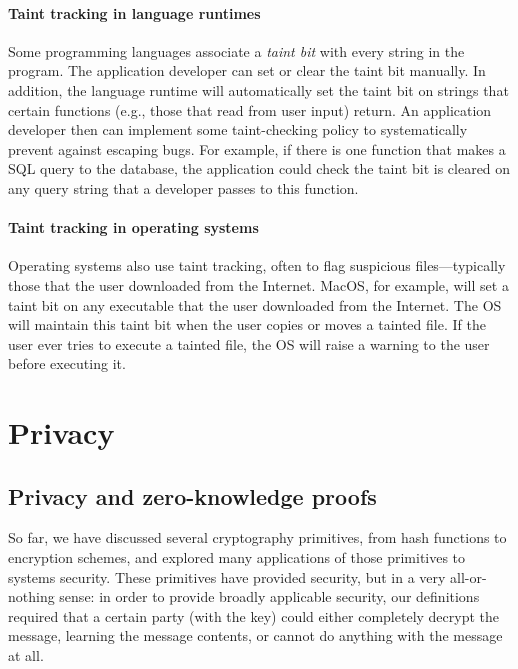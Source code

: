\documentclass[
  letterpaper,
]{scrbook}
\theoremstyle{definition}
\theoremstyle{plain}
\theoremstyle{plain}
\theoremstyle{remark}
\begin{document}
\subsection{Taint tracking in language
runtimes}\label{taint-tracking-in-language-runtimes}

Some programming languages associate a \emph{taint bit} with every
string in the program. The application developer can set or clear the
taint bit manually. In addition, the language runtime will automatically
set the taint bit on strings that certain functions (e.g., those that
read from user input) return. An application developer then can
implement some taint-checking policy to systematically prevent against
escaping bugs. For example, if there is one function that makes a SQL
query to the database, the application could check the taint bit is
cleared on any query string that a developer passes to this function.

\subsection{Taint tracking in operating
systems}\label{taint-tracking-in-operating-systems}

Operating systems also use taint tracking, often to flag suspicious
files---typically those that the user downloaded from the Internet.
MacOS, for example, will set a taint bit on any executable that the user
downloaded from the Internet. The OS will maintain this taint bit when
the user copies or moves a tainted file. If the user ever tries to
execute a tainted file, the OS will raise a warning to the user before
executing it.

\part{Privacy}

\chapter{Privacy and zero-knowledge
proofs}\label{privacy-and-zero-knowledge-proofs}

So far, we have discussed several cryptography primitives, from hash
functions to encryption schemes, and explored many applications of those
primitives to systems security. These primitives have provided security,
but in a very all-or-nothing sense: in order to provide broadly
applicable security, our definitions required that a certain party (with
the key) could either completely decrypt the message, learning the
message contents, or cannot do anything with the message at all.
\end{document}
